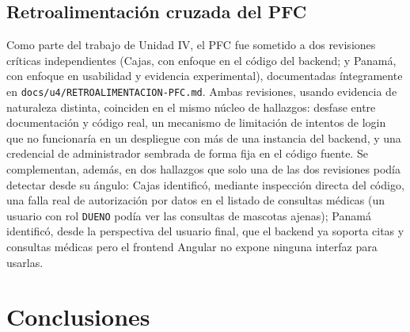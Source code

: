 \documentclass[11pt,a4paper]{article}
\begin{document}
\subsection{Retroalimentación cruzada del PFC}

Como parte del trabajo de Unidad IV, el PFC fue sometido a dos revisiones
críticas independientes (Cajas, con enfoque en el código del backend; y
Panamá, con enfoque en usabilidad y evidencia experimental), documentadas
íntegramente en \texttt{docs/u4/RETROALIMENTACION-PFC.md}. Ambas
revisiones, usando evidencia de naturaleza distinta, coinciden en el mismo
núcleo de hallazgos: desfase entre documentación y código real, un
mecanismo de limitación de intentos de login que no funcionaría en un
despliegue con más de una instancia del backend, y una credencial de
administrador sembrada de forma fija en el código fuente. Se complementan,
además, en dos hallazgos que solo una de las dos revisiones podía detectar
desde su ángulo: Cajas identificó, mediante inspección directa del código,
una falla real de autorización por datos en el listado de consultas
médicas (un usuario con rol \texttt{DUENO} podía ver las consultas de
mascotas ajenas); Panamá identificó, desde la perspectiva del usuario
final, que el backend ya soporta citas y consultas médicas pero el
frontend Angular no expone ninguna interfaz para usarlas.

\section{Conclusiones}
\end{document}
